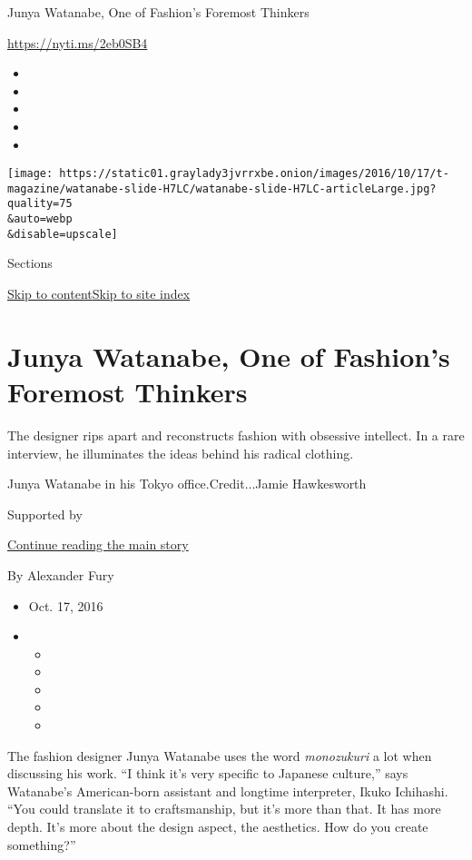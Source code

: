 Junya Watanabe, One of Fashion's Foremost Thinkers

\url{https://nyti.ms/2eb0SB4}

\begin{itemize}
\item
\item
\item
\item
\item
\end{itemize}

\texttt{[image: https://static01.graylady3jvrrxbe.onion/images/2016/10/17/t-magazine/watanabe-slide-H7LC/watanabe-slide-H7LC-articleLarge.jpg?quality=75\\\&auto=webp\\\&disable=upscale]}

Sections

\protect\hyperlink{site-content}{Skip to
content}\protect\hyperlink{site-index}{Skip to site index}

\hypertarget{junya-watanabe-one-of-fashions-foremost-thinkers}{%
\section{Junya Watanabe, One of Fashion's Foremost
Thinkers}\label{junya-watanabe-one-of-fashions-foremost-thinkers}}

The designer rips apart and reconstructs fashion with obsessive
intellect. In a rare interview, he illuminates the ideas behind his
radical clothing.

Junya Watanabe in his Tokyo office.Credit...Jamie Hawkesworth

Supported by

\protect\hyperlink{after-sponsor}{Continue reading the main story}

By Alexander Fury

\begin{itemize}
\item
  Oct. 17, 2016
\item
  \begin{itemize}
  \item
  \item
  \item
  \item
  \item
  \end{itemize}
\end{itemize}

The fashion designer Junya Watanabe uses the word \emph{monozukuri} a
lot when discussing his work. ``I think it's very specific to Japanese
culture,'' says Watanabe's American-­born assistant and longtime
interpreter, Ikuko Ichihashi. ``You could translate it to craftsmanship,
but it's more than that. It has more depth. It's more about the design
aspect, the aesthetics. How do you create something?''

